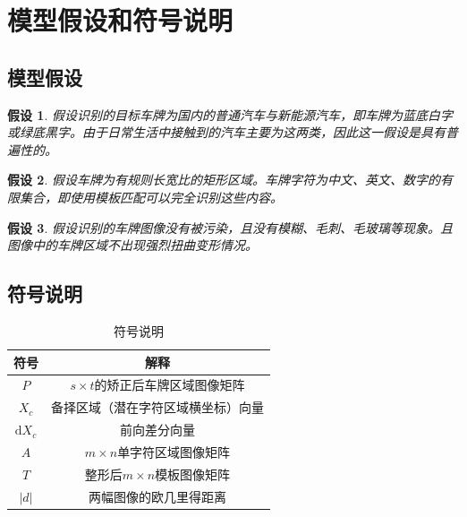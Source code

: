 \documentclass[utf8,a4paper]{ctexart}
\newtheorem{ass}{假设}
\begin{document}
\section{模型假设和符号说明}
\subsection{模型假设}
\begin{ass}
    假设识别的目标车牌为国内的普通汽车与新能源汽车，即车牌为蓝底白字或绿底黑字。由于日常生活中接触到的汽车主要为这两类，因此这一假设是具有普遍性的。
\end{ass}

\begin{ass}
    假设车牌为有规则长宽比的矩形区域。车牌字符为中文、英文、数字的有限集合，即使用模板匹配可以完全识别这些内容。
\end{ass}

\begin{ass}
    假设识别的车牌图像没有被污染，且没有模糊、毛刺、毛玻璃等现象。且图像中的车牌区域不出现强烈扭曲变形情况。
\end{ass}

\subsection{符号说明}

\begin{table}[H]
    \centering
    \caption{符号说明}
    \begin{tabular}{cc}
        \hline
        符号           & 解释                          \\
        \hline
        $P$            & $s\times t$的矫正后车牌区域图像矩阵                        \\
        $X_c$   & 备择区域（潜在字符区域横坐标）向量                                                 \\
        ${\mathrm d} X_c$ & 前向差分向量                                                 \\
        $A$ & $m \times n$单字符区域图像矩阵                                                 \\
        $T$ & 整形后$m\times n$模板图像矩阵                                                \\
        $|d|$ & 两幅图像的欧几里得距离                                                 \\
        \hline
    \end{tabular}
    \label{tab:my_label}
\end{table}
\end{document}
